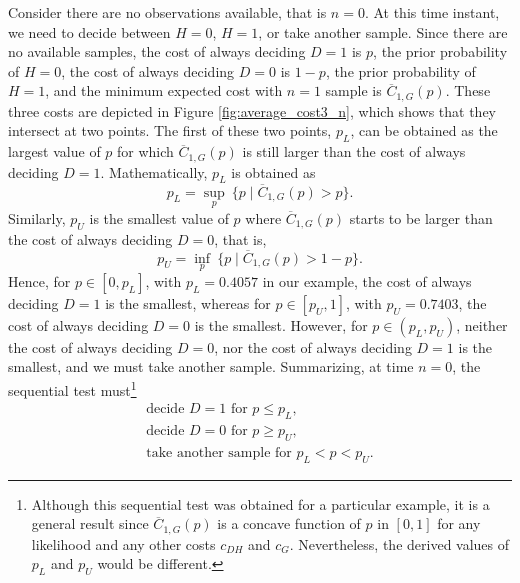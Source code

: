Consider there are no observations available, that is $n = 0$. At this time instant, we need to decide between $H = 0$, $H = 1$, or take another sample. Since there are no available samples, the cost of always deciding $D = 1$ is $p$, the prior probability of $H = 0$, the cost of always deciding $D = 0$ is $1 - p$, the prior probability of $H = 1$, and the minimum expected cost with $n = 1$ sample is $\overline{C}_{1,G}(p)$. These three costs are depicted in Figure \ref{fig:average_cost3_n}, which shows that they intersect at two points. The first of these two points, $p_L$, can be obtained as the largest value of $p$ for which $\overline{C}_{1,G}(p)$ is still larger than the cost of always deciding $D = 1$. Mathematically, $p_L$ is obtained as
\begin{equation*}
	p_L = \sup_{p} \ \{p \mid \overline{C}_{1,G}(p) > p\}.
\end{equation*}
Similarly, $p_U$ is the smallest value of $p$ where $\overline{C}_{1,G}(p)$ starts to be larger than the cost of always deciding $D = 0$, that is,
\begin{equation*}
	p_U = \inf_{p} \  \{p \mid \overline{C}_{1,G}(p) > 1 - p\}.
\end{equation*}
Hence, for $p \in [0,p_L]$, with $p_L = 0.4057$ in our example, the cost of always deciding $D = 1$ is the smallest, whereas for $p \in [p_U,1]$, with $p_U = 0.7403$, the cost of always deciding $D = 0$ is the smallest. However, for $p \in (p_L,p_U)$, neither the cost of always deciding $D = 0$, nor the cost of always deciding $D = 1$ is the smallest, and we must take another sample. Summarizing, at time $n = 0$, the sequential test must\footnote{Although this sequential test was obtained for a particular example, it is a general result since $\overline{C}_{1,G}(p)$ is a concave function of $p$ in $[0,1]$ for any likelihood and any other costs $c_{DH}$ and $c_{G}$. Nevertheless, the derived values of $p_L$ and $p_U$ would be different.}
\begin{equation}
\label{eq:seq_test_n0}
\begin{array}{l}
	\text{decide } D = 1 \text{ for } p \leq p_L, \\
	\text{decide } D = 0 \text{ for } p \geq p_U, \\
	\text{take another sample for } p_L < p < p_U.
\end{array}
\end{equation}

